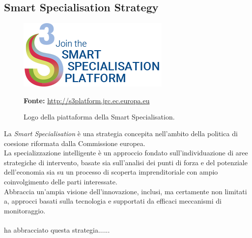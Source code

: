 \subsection{Smart Specialisation Strategy}
\begin{figure}[H]
	\begin{center}
	\includegraphics[scale=0.4]{immagini/join-s3p.png}
	\caption{Logo della piattaforma della Smart Specialisation.}
	\small{\textbf{Fonte:} \url{http://s3platform.jrc.ec.europa.eu}}
	\end{center}
\end{figure}

La \textit{Smart Specialisation} è una strategia concepita nell'ambito della politica di coesione riformata dalla Commissione europea.\\
La specializzazione intelligente è un approccio fondato sull'individuazione di aree strategiche di intervento, basate sia sull'analisi dei punti di forza e del potenziale dell'economia sia su un processo di scoperta imprenditoriale con ampio coinvolgimento delle parti interessate.\\
Abbraccia un'ampia visione dell'innovazione, inclusi, ma certamente non limitati a, approcci basati sulla tecnologia e supportati da efficaci meccanismi di monitoraggio.\\
\\
\lab{} ha abbracciato questa strategia......

